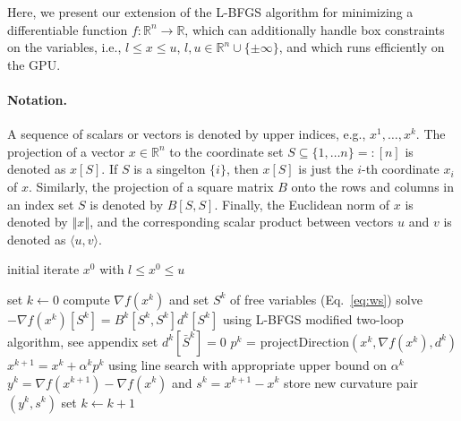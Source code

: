 \documentclass[letterpaper]{article} %
\newcommand{\setR}{\mathbb{R}}
\newcommand{\sprod}[2]{\langle{#1}, {#2}\rangle}
\newcommand{\norm}[1]{\left\Vert#1\right\Vert}
\begin{document}
Here, we present our extension of the L-BFGS algorithm for minimizing a differentiable function $f\colon\setR^n\to\setR$, which can additionally handle box constraints on the variables, i.e., $l\leq x\leq u$, $l, u\in\setR^n\cup \{\pm\infty\}$, and which runs efficiently on the GPU.

\paragraph{Notation.} A sequence of scalars or vectors is denoted by upper indices, e.g., $x^1,\ldots,x^k$. The projection of a vector $x\in\setR^n$ to the coordinate set $S\subseteq\{1, \ldots n\}=:[n]$ is denoted as $x[S]$. If $S$ is a singelton $\{i\}$, then $x[S]$ is just the $i$-th coordinate $x_i$ of $x$. Similarly, the projection of a square matrix $B$ onto the rows and columns in an index set $S$ is denoted by $B[S, S]$. Finally, the Euclidean norm of $x$ is denoted by $\norm{x}$, and the corresponding scalar product between vectors $u$ and $v$ is denoted as $\sprod{u}{v}$. 

\begin{algorithm}[h!]
   \caption{GPU-efficient L-BFGS-B Method}
   \label{algo:1}
\begin{algorithmic}[1]
    initial iterate $x^0$ with $l\leq x^0\leq u$
   \vspace{0.2cm}
   
    set $k\leftarrow 0$
   \REPEAT
   \STATE compute $\nabla f(x^k)$ and set $S^k$ of free variables (Eq.~\ref{eq:ws})
   \STATE solve $-\nabla f(x^k)[S^k]=B^k[S^k, S^k] d^k[S^k]$ using\newline
   \hspace*{2.5ex}\mbox{L-BFGS} modified two-loop algorithm, see appendix \label{line:0}
   \STATE set $d^k[\bar S^k] = 0$
   \STATE $p^k$ = projectDirection$(x^k, \nabla f(x^k), d^k)$
   \STATE $x^{k+1} = x^k + \alpha^k p^k$ using line search with appropriate \newline 
   \hspace*{2.2ex} upper bound on $\alpha^k$
   \STATE $y^k=\nabla f(x^{k+1}) - \nabla f(x^k)$ and $s^k=x^{k+1}-x^{k}$
   \STATE store new curvature pair $(y^k, s^k)$ %
   \STATE set $k\leftarrow k+1$
\end{algorithmic}
\end{algorithm}
\end{document}
